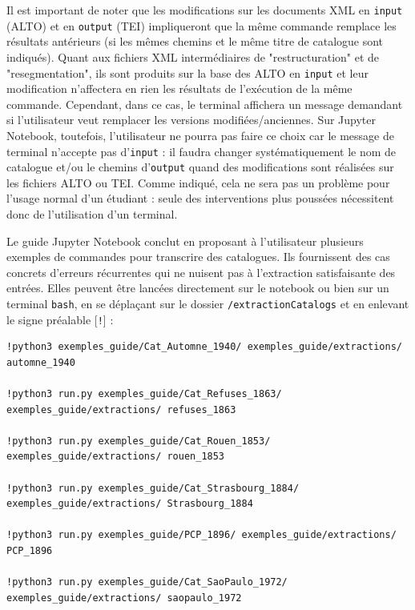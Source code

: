 \documentclass[a4paper,12pt,twoside]{book}
\begin{document}
Il est important de noter que les modifications sur les documents XML en \texttt{input} (ALTO) et en \texttt{output} (TEI) impliqueront que la même commande remplace les résultats antérieurs (si les mêmes chemins et le même titre de catalogue sont indiqués). Quant aux fichiers XML intermédiaires de "restructuration" et de "resegmentation", ils sont produits sur la base des ALTO en \texttt{input} et leur modification n'affectera en rien les résultats de l'exécution de la même commande. Cependant, dans ce cas, le terminal affichera un message demandant si l'utilisateur veut remplacer les versions modifiées/anciennes. Sur Jupyter Notebook, toutefois, l'utilisateur ne pourra pas faire ce choix car le message de terminal n'accepte pas d'\texttt{input} : il faudra changer systématiquement le nom de catalogue et/ou le chemins d'\texttt{output} quand des modifications sont réalisées sur les fichiers ALTO ou TEI. Comme indiqué, cela ne sera pas un problème pour l'usage normal d'un étudiant : seule des interventions plus poussées nécessitent donc de l'utilisation d'un terminal. 

Le guide Jupyter Notebook conclut en proposant à l'utilisateur plusieurs exemples de commandes pour transcrire des catalogues. Ils fournissent des cas concrets d'erreurs récurrentes qui ne nuisent pas à l'extraction satisfaisante des entrées. Elles peuvent être lancées directement sur le notebook ou bien sur un terminal \texttt{bash}, en se déplaçant sur le dossier \texttt{/extractionCatalogs} et en enlevant le signe préalable [\texttt{!}] : 

\begin{scriptsize}
	\begin{verbatim}
!python3 exemples_guide/Cat_Automne_1940/ exemples_guide/extractions/ automne_1940

!python3 run.py exemples_guide/Cat_Refuses_1863/ exemples_guide/extractions/ refuses_1863

!python3 run.py exemples_guide/Cat_Rouen_1853/ exemples_guide/extractions/ rouen_1853

!python3 run.py exemples_guide/Cat_Strasbourg_1884/ exemples_guide/extractions/ Strasbourg_1884

!python3 run.py exemples_guide/PCP_1896/ exemples_guide/extractions/ PCP_1896

!python3 run.py exemples_guide/Cat_SaoPaulo_1972/ exemples_guide/extractions/ saopaulo_1972
	\end{verbatim}
\end{scriptsize}
\end{document}
